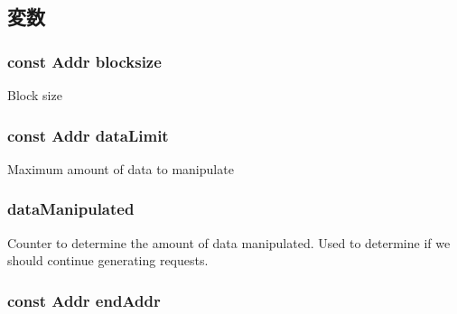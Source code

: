 \subsection{変数}
\hypertarget{classRandomGen_aebddb11d20f173e7a5ec2c9f2f591171}{
\subsubsection[{blocksize}]{\setlength{\rightskip}{0pt plus 5cm}const {\bf Addr} {\bf blocksize}}}
\label{classRandomGen_aebddb11d20f173e7a5ec2c9f2f591171}
Block size \hypertarget{classRandomGen_ad6ef2f2a9a6167b2d84c3246a2dd2e92}{
\subsubsection[{dataLimit}]{\setlength{\rightskip}{0pt plus 5cm}const {\bf Addr} {\bf dataLimit}}}
\label{classRandomGen_ad6ef2f2a9a6167b2d84c3246a2dd2e92}
Maximum amount of data to manipulate \hypertarget{classRandomGen_a708cc056d3a52d0f8f5a2cceffdc6d99}{
\subsubsection[{dataManipulated}]{ {\bf dataManipulated}}}
\label{classRandomGen_a708cc056d3a52d0f8f5a2cceffdc6d99}
Counter to determine the amount of data manipulated. Used to determine if we should continue generating requests. \hypertarget{classRandomGen_a1f198116a3da3ee4d73abf4760f70815}{
\subsubsection[{endAddr}]{\setlength{\rightskip}{0pt plus 5cm}const {\bf Addr} {\bf endAddr}}}

